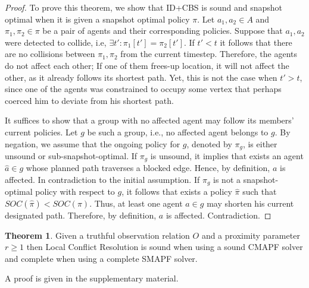 \documentclass[letterpaper]{article} %
\def\
UrlFont{\rm}  %
\newcommand{\nir}[1]{\textbf{[\color{blue}NIR:#1]}}
\newcommand{\roni}[1]{\textbf{[\color{orange}RONI:#1]}}
\theoremstyle{definition}
\newtheorem{theorem}{Theorem}
\newtheorem{corollary}{Corollary}
\begin{document}
\begin{proof}
To prove this theorem, we show that ID+CBS is sound and snapshot optimal when it is given a snapshot optimal policy $\pi$.
    Let $a_1, a_2\in A$ and $\pi_1, \pi_2 \in \pi$ be a pair of agents and their corresponding policies.
    Suppose that $a_1, a_2$ were detected to collide, i.e, $\exists t': \pi_1[t'] = \pi_2[t']$.
    If $t'<t$ it follows that there are no collisions between $\pi_1, \pi_2$ from the current timestep. Therefore, the agents do not affect each other; If one of them frees-up location, it will not affect the other, as it already follows its shortest path. Yet, this is not the case when $t' > t$, since one of the agents was constrained to occupy some vertex that perhaps coerced him to deviate from his shortest path.

    It suffices to show that a group with no affected agent may follow its members' current policies. Let $g$ be such a group, i.e., no affected agent belongs to $g$. By negation, we assume that the ongoing policy for $g$, denoted by $\pi_g$, is either unsound or sub-snapshot-optimal. If $\pi_g$ is unsound, it implies that exists an agent $\hat{a} \in g$ whose planned path traverses a blocked edge. Hence, by definition, $a$ is affected. In contradiction to the initial assumption. If $\pi_g$ is not a snapshot-optimal policy with respect to $g$, it follows that exists a policy $\hat{\pi}$ such that $SOC(\hat{\pi})<SOC(\pi)$. Thus, at least one agent $a \in g$ may shorten his current designated path. Therefore, by definition, $a$ is affected. Contradiction.
\end{proof}


\begin{theorem}
   Given a truthful observation relation $O$ and a proximity parameter $r\ge1$ then Local Conflict Resolution is sound when using a sound CMAPF solver and complete when using a complete SMAPF solver.
\end{theorem}
\noindent A proof is given in the supplementary material.









\end{document}

